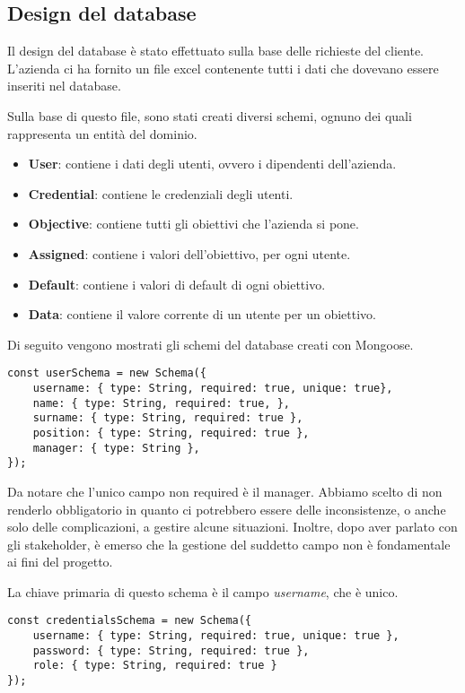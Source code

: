 
\subsection{Design del database}

Il design del database è stato effettuato sulla base delle richieste del cliente.
L'azienda ci ha fornito un file excel contenente tutti i dati che dovevano essere inseriti nel database.

Sulla base di questo file, sono stati creati diversi schemi, ognuno dei quali rappresenta un entità del dominio.

\begin{itemize}
    \item \textbf{User}: contiene i dati degli utenti, ovvero i dipendenti dell'azienda.
    \item \textbf{Credential}: contiene le credenziali degli utenti.
    \item \textbf{Objective}: contiene tutti gli obiettivi che l'azienda si pone.
    \item \textbf{Assigned}: contiene i valori dell'obiettivo, per ogni utente.
    \item \textbf{Default}: contiene i valori di default di ogni obiettivo.
    \item \textbf{Data}: contiene il valore corrente di un utente per un obiettivo.
\end{itemize}

Di seguito vengono mostrati gli schemi del database creati con Mongoose.

\begin{verbatim}
const userSchema = new Schema({
    username: { type: String, required: true, unique: true},
    name: { type: String, required: true, },
    surname: { type: String, required: true },
    position: { type: String, required: true },
    manager: { type: String },
});
\end{verbatim}

Da notare che l'unico campo non required è il manager. Abbiamo scelto di non renderlo obbligatorio in quanto
ci potrebbero essere delle inconsistenze, o anche solo delle complicazioni, a gestire alcune situazioni.
Inoltre, dopo aver parlato con gli stakeholder, è emerso che la gestione del suddetto campo non è fondamentale 
ai fini del progetto.

La chiave primaria di questo schema è il campo \textit{username}, che è unico.

\begin{verbatim}
const credentialsSchema = new Schema({
    username: { type: String, required: true, unique: true },
    password: { type: String, required: true },
    role: { type: String, required: true }
});
\end{verbatim}


